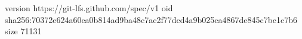 version https://git-lfs.github.com/spec/v1
oid sha256:70372e624a60ea0b814ad9ba48c7ac2f77dcd4a9b025ca4867de845c7bc1c7b6
size 71131
